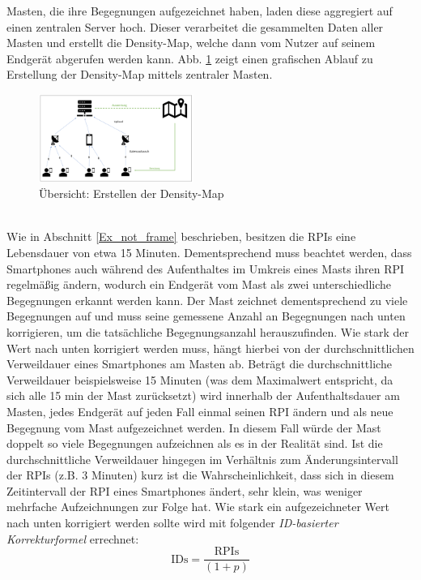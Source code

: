 \documentclass[conference,compsoc]{IEEEtran}
\begin{document}
Masten, die ihre Begegnungen aufgezeichnet haben, laden diese aggregiert auf einen zentralen Server hoch. 
Dieser verarbeitet die gesammelten Daten aller Masten und erstellt die Density-Map, welche dann vom Nutzer auf seinem Endgerät abgerufen werden kann.
Abb. \ref{density_creation} zeigt einen grafischen Ablauf zu Erstellung der Density-Map mittels zentraler Masten. \\
\begin{figure}[h]
	\centering
	\includegraphics[width=0.45\textwidth]{"Density_Map_Overview"}
	\caption{Übersicht: Erstellen der Density-Map}
	\label{density_creation}
\end{figure} 
\\
Wie in Abschnitt \ref{Ex_not_frame} beschrieben, besitzen die RPIs eine Lebensdauer von etwa 15 Minuten. 
Dementsprechend muss beachtet werden, dass Smartphones auch während des Aufenthaltes im Umkreis eines Masts ihren RPI regelmäßig ändern, wodurch ein Endgerät vom Mast als zwei unterschiedliche Begegnungen erkannt werden kann. 
Der Mast zeichnet dementsprechend zu viele Begegnungen auf und muss seine gemessene Anzahl an Begegnungen nach unten korrigieren, um die tatsächliche Begegnungsanzahl herauszufinden. 
Wie stark der Wert nach unten korrigiert werden muss, hängt hierbei von der durchschnittlichen Verweildauer eines Smartphones am Masten ab. 
Beträgt die durchschnittliche Verweildauer beispielsweise 15 Minuten (was dem Maximalwert entspricht, da sich alle 15 min der Mast zurücksetzt) 
wird innerhalb der Aufenthaltsdauer am Masten, jedes Endgerät auf jeden Fall einmal seinen RPI ändern und als neue Begegnung vom Mast aufgezeichnet werden. 
In diesem Fall würde der Mast doppelt so viele Begegnungen aufzeichnen als es in der Realität sind.
Ist die durchschnittliche Verweildauer hingegen im Verhältnis zum Änderungsintervall der RPIs (z.B. 3 Minuten) kurz ist die Wahrscheinlichkeit,
dass sich in diesem Zeitintervall der RPI eines Smartphones ändert, sehr klein, was weniger mehrfache Aufzeichnungen zur Folge hat. 
Wie stark ein aufgezeichneter Wert nach unten korrigiert werden sollte wird mit folgender \textit{ID-basierter Korrekturformel} errechnet: 
\begin{equation}
	\text{IDs} = \frac{\text{RPIs}}{(1+p)}
\end{equation}
\end{document}
